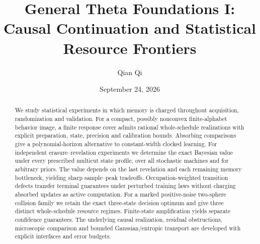 
\usepackage{tikz}
\usetikzlibrary{arrows.meta,positioning}
\newcommand{\Wone}{W_1}
\newcommand{\Del}{\Delta}
\newcommand{\emptyw}{\varnothing}
\newcommand{\osc}{\operatorname{osc}}
\newcommand{\diam}{\operatorname{diam}}
\newcommand{\Lipone}{\operatorname{Lip}_1}
\newcommand{\aff}{\operatorname{aff}}
\newcommand{\conv}{\operatorname{conv}}
\newcommand{\rplus}{\operatorname{rank}_{+}}
\newcommand{\dpr}{\delta^{\rm p}}
\newcommand{\dhi}{\delta^{\rm h}}
\newcommand{\dvi}{\delta^{\rm v}}
\newcommand{\dmix}{\delta^{\rm mix}}
\newcommand{\cK}{\mathcal K}
\newcommand{\cB}{\mathcal B}
\newcommand{\cI}{\mathcal I}
\newcommand{\KL}{\operatorname{KL}}
\newcommand{\vaudit}{v^{\rm aud}}
\title[General Theta Foundations I]{General Theta Foundations I:\\Causal Continuation and Statistical Resource Frontiers}
\author{Qian Qi}
\date{September 24, 2026}

\begin{abstract}
We study statistical experiments in which memory is charged throughout
acquisition, randomization and validation. For a compact, possibly
nonconvex finite-alphabet behavior image, a finite response cover admits
rational whole-schedule realizations with explicit preparation, state,
precision and calibration bounds. Absorbing comparisons give a
polynomial-horizon alternative to constant-width clocked learning.
For independent erasure--revelation experiments we determine the exact
Bayesian value under every prescribed multicut state profile, over all
stochastic machines and for arbitrary priors. The value depends on the
last revelation and each remaining memory bottleneck, yielding sharp
sample--peak tradeoffs. Occupation-weighted transition defects transfer
terminal guarantees under perturbed training laws without charging
absorbed updates as active computation. For a marked positive-noise
two-sphere collision family we retain the exact three-state decision
optimum and give three distinct whole-schedule resource regimes.
Finite-state amplification yields separate confidence guarantees.
The underlying causal realization, residual obstructions, microscopic
comparison and bounded Gaussian/entropic transport are developed with
explicit interfaces and error budgets.
\end{abstract}
\maketitle
\tableofcontents
